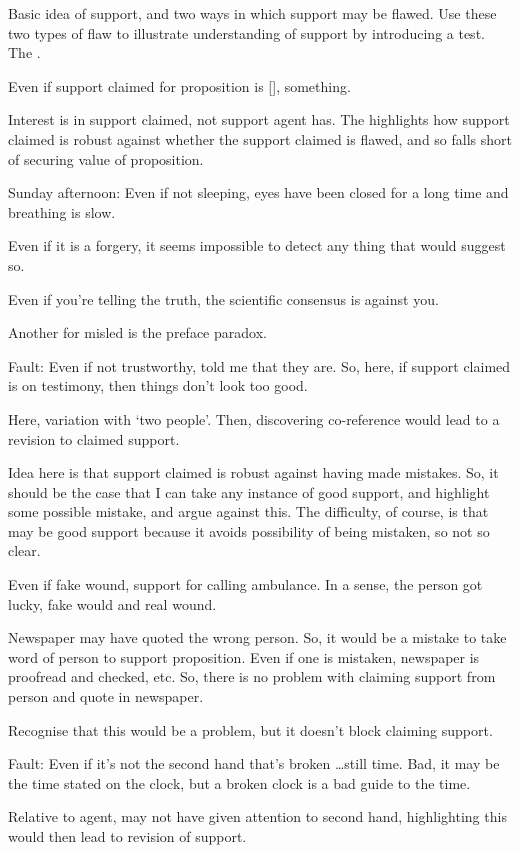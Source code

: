 \begin{note}
  Basic idea of support, and two ways in which support may be flawed.
  Use these two types of flaw to illustrate understanding of support by introducing a test.
  The \eit{}.

  Even if support claimed for proposition is [], something.

  Interest is in support claimed, not support agent has.
  The \eit{} highlights how support claimed is robust against whether the support claimed is flawed, and so falls short of securing value of proposition.
\end{note}


\begin{note}

  Sunday afternoon: Even if not sleeping, eyes have been closed for a long time and breathing is slow.

  Even if it is a forgery, it seems impossible to detect any thing that would suggest so.

  Even if you're telling the truth, the scientific consensus is against you.

  Another for misled is the preface paradox.


  Fault:
  Even if not trustworthy, told me that they are.
  So, here, if support claimed is on testimony, then things don't look too good.

  Here, variation with `two people'.
  Then, discovering co-reference would lead to a revision to claimed support.
\end{note}

\begin{note}

  Idea here is that support claimed is robust against having made mistakes.
  So, it should be the case that I can take any instance of good support, and highlight some possible mistake, and argue against this.
  The difficulty, of course, is that may be good support because it avoids possibility of being mistaken, so not so clear.

  Even if fake wound, support for calling ambulance.
  In a sense, the person got lucky, fake would and real wound.


  Newspaper may have quoted the wrong person.
  So, it would be a mistake to take word of person to support proposition.
  Even if one is mistaken, newspaper is proofread and checked, etc.
  So, there is no problem with claiming support from person and quote in newspaper.

  Recognise that this would be a problem, but it doesn't block claiming support.

  Fault:
  Even if it's not the second hand that's broken \dots still time.
  Bad, it may be the time stated on the clock, but a broken clock is a bad guide to the time.

  Relative to agent, may not have given attention to second hand, highlighting this would then lead to revision of support.
\end{note}


